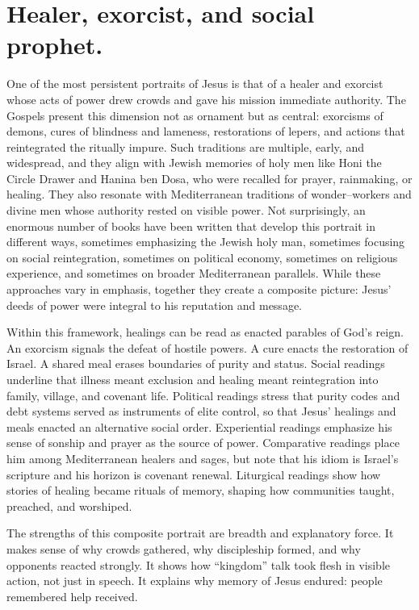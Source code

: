 \section{Healer, exorcist, and social prophet.}\label{sec:healer}

One of the most persistent portraits of Jesus is that of a healer and exorcist whose acts of power drew crowds and gave his mission immediate authority.
The Gospels present this dimension not as ornament but as central: exorcisms of demons, cures of blindness and lameness, restorations of lepers, and actions that reintegrated the ritually impure.
Such traditions are multiple, early, and widespread, and they align with Jewish memories of holy men like Honi the Circle Drawer and Hanina ben Dosa, who were recalled for prayer, rainmaking, or healing.
They also resonate with Mediterranean traditions of wonder–workers and divine men whose authority rested on visible power.
Not surprisingly, an enormous number of books have been written that develop this portrait in different ways, sometimes emphasizing the Jewish holy man, sometimes focusing on social reintegration, sometimes on political economy, sometimes on religious experience, and sometimes on broader Mediterranean parallels.
While these approaches vary in emphasis, together they create a composite picture: Jesus’ deeds of power were integral to his reputation and message.

Within this framework, healings can be read as enacted parables of God’s reign.
An exorcism signals the defeat of hostile powers.
A cure enacts the restoration of Israel.
A shared meal erases boundaries of purity and status.
Social readings underline that illness meant exclusion and healing meant reintegration into family, village, and covenant life.
Political readings stress that purity codes and debt systems served as instruments of elite control, so that Jesus’ healings and meals enacted an alternative social order.
Experiential readings emphasize his sense of sonship and prayer as the source of power.
Comparative readings place him among Mediterranean healers and sages, but note that his idiom is Israel’s scripture and his horizon is covenant renewal.
Liturgical readings show how stories of healing became rituals of memory, shaping how communities taught, preached, and worshiped.

The strengths of this composite portrait are breadth and explanatory force.
It makes sense of why crowds gathered, why discipleship formed, and why opponents reacted strongly.
It shows how “kingdom” talk took flesh in visible action, not just in speech.
It explains why memory of Jesus endured: people remembered help received.

